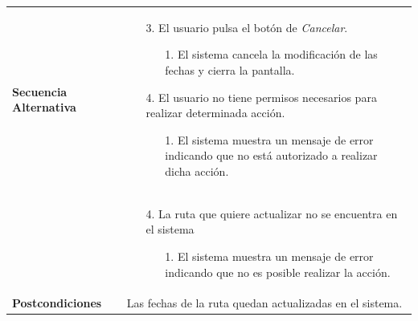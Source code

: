 \begin{longtable}{| p{4cm} | p{10cm} |}
\hline
\textbf{Secuencia Alternativa} &\mbox{}\par\vspace{-\baselineskip}
\begin{enumerate}[leftmargin=0.7cm, topsep=0.1cm]
\item[3.] El usuario pulsa el botón de \textit{Cancelar}.
	\begin{itemize}
	\item[1.] El sistema cancela la modificación de las fechas y cierra la pantalla.
	\end{itemize}
\item[4.] El usuario no tiene permisos necesarios para realizar determinada acción.
	\begin{itemize}
	\item[1.] El sistema muestra un mensaje de error indicando que no está autorizado a realizar dicha acción.
	\end{itemize}
\end{enumerate}
\\ &\mbox{}\par\vspace{-\baselineskip}	
\begin{enumerate}[leftmargin=0.7cm, topsep=0.1cm]
\item[4.] La ruta que quiere actualizar no se encuentra en el sistema
	\begin{itemize}
	\item[1.] El sistema muestra un mensaje de error indicando que no es posible realizar la acción.
	\end{itemize}
\end{enumerate}
\\

\hline
\textbf{Postcondiciones} & 
Las fechas de la ruta quedan actualizadas en el sistema.\\
\hline
\end{longtable}



\newpage
